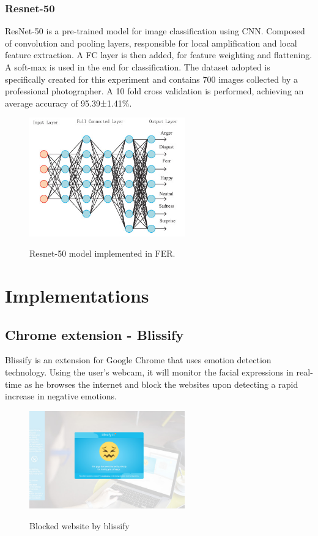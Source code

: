 \documentclass[12pt,a4paper,oneside,english]{book}
\begin{document}
\subsubsection{Resnet-50}
ResNet-50 is a pre-trained model for image classification using CNN. Composed of convolution and pooling layers, responsible for local amplification and local feature extraction. A FC layer is then added, for feature weighting and flattening. A soft-max is used in the end for classification. The dataset adopted is specifically created for this experiment and contains 700 images collected by a professional photographer. A 10 fold cross validation is performed, achieving an average accuracy of 95.39±1.41\%. 
\begin{figure}[H]
    \centering
    \includegraphics[width=0.6\textwidth]{figures/State of art/resnet50model.png}
    \caption{Resnet-50 model implemented in FER.}
    \label{fig:resnet50article}
    \cite{resnet50article}
\end{figure}
\noindent


\section{Implementations}
\subsection{Chrome extension - Blissify}
Blissify is an extension for Google Chrome that uses emotion detection technology. Using the user's webcam, it will monitor the facial expressions in real-time as he browses the internet and block the websites upon detecting a rapid increase in negative emotions.
\begin{figure}[H]
    \centering
    \includegraphics[width=0.6\textwidth]{figures/State of art/blissify.PNG}
    \caption{Blocked website by blissify}
    \label{fig:blissify}
    \cite{blissify}
\end{figure}
\end{document}
